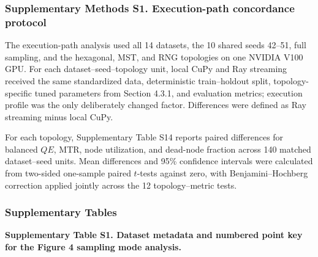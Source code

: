 \documentclass[
]{article}
\providecommand{\DIFadd}[1]{{\protect\color{blue} #1}} %
\providecommand{\DIFaddbegin}{} %
\providecommand{\DIFaddend}{} %
\begin{document}
\DIFaddbegin \subsubsection{\DIFadd{Supplementary Methods S1. Execution-path concordance
protocol}}\label{supplementary-methods-s1.-execution-path-concordance-protocol}

\DIFadd{The execution-path analysis used all 14 datasets, the 10 shared seeds
42--51, full sampling, and the hexagonal, MST, and RNG topologies on one
NVIDIA V100 GPU. For each dataset--seed--topology unit, local CuPy and
Ray streaming received the same standardized data, deterministic
train--holdout split, topology-specific tuned parameters from Section
4.3.1, and evaluation metrics; execution profile was the only
deliberately changed factor. Differences were defined as Ray streaming
minus local CuPy.
}

\DIFadd{For each topology, Supplementary Table S14 reports paired differences
for balanced \(QE\), MTR, node utilization, and dead-node fraction
across 140 matched dataset--seed units. Mean differences and 95\%
confidence intervals were calculated from two-sided one-sample paired
\(t\)-tests against zero, with Benjamini--Hochberg correction applied
jointly across the 12 topology--metric tests.
}

\subsubsection{\DIFadd{Supplementary Tables}}\label{supplementary-tables}

\DIFaddend \textbf{Supplementary Table S1. Dataset metadata and numbered point key
for the Figure 4 sampling mode analysis.}
\end{document}
